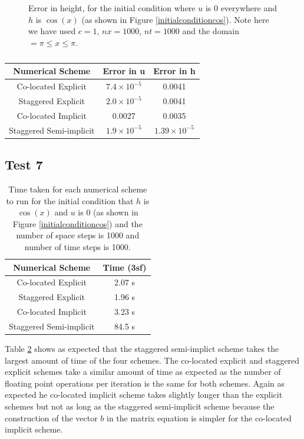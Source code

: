 \documentclass[a4paper,12pt, notitlepage]{article}
\begin{document}
{\begin{figure} [H]
\begin{minipage}{.5\textwidth}
		\caption{\label{error_height} Error in height, for the initial condition where $u$ is 0 everywhere and $h$ is $\cos(x)$ (as shown in Figure \ref{initialconditioncos}). Note here we have used $c = 1$, $nx = 1000$, $nt = 1000$ and the domain $=\pi\leq x \leq \pi$.} 
	\end{minipage}
\end{figure}



\begin{table}[H]
	\centering
	\begin{tabular}{|c | c| c|} 
		\hline
		\textbf{Numerical Scheme} & \textbf{Error in u} & \textbf{Error in h}  \\
		\hline
		Co-located Explicit & $7.4 \times 10^{-5}$ & 0.0041\\ 
		\hline
		Staggered Explicit &  $2.0 \times 10^{-5}$ & 0.0041\\
		\hline
		Co-located  Implicit & 0.0027 & 0.0035 \\
		\hline
		Staggered Semi-implicit & $1.9 \times 10^{-5}$ & $1.39\times 10 ^{-5}$ \\
		\hline
	\end{tabular}
	\caption{}
	\label{errortable}
\end{table}

\subsection{Test 7}

\begin{table}[H]
	\centering
	\begin{tabular}{|c | c|} 
		\hline
		\textbf{Numerical Scheme} & \textbf{Time (3sf)}  \\
		\hline
		Co-located Explicit & 2.07 s \\ 
		\hline
	    Staggered Explicit & 1.96 s \\
		\hline
		Co-located  Implicit & 3.23 s \\
		\hline
		Staggered Semi-implicit & 84.5 s \\
		\hline
	\end{tabular}
\caption{Time taken for each numerical scheme to run for the initial condition that $h$ is $\cos(x)$ and $u$ is $0$ (as shown in Figure \ref{initialconditioncos}) and the number of space steps is 1000 and number of time steps is 1000.}
\label{timingtable}
\end{table}

Table \ref{timingtable} shows as expected that the staggered semi-implict scheme takes the largest amount of time of the four schemes. The co-located explicit and staggered explicit schemes take a similar amount of time as expected as the number of floating point operations per iteration is the same for both schemes. Again as expected he co-located implicit scheme takes slightly longer than the explicit schemes but not as long as the staggered semi-implicit scheme because the construction of the vector $b$ in the matrix equation is simpler for the co-located implicit scheme.

}
\end{document}
